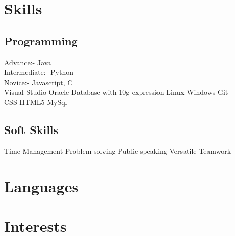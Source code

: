 \documentclass[]{mmynayak-resume-openfont}
\begin{document}
\begin{minipage}[t]{0.33\textwidth}

\section{Skills}
\subsection{Programming}

\textbullet{} Advance:- Java \\  \textbullet{} Intermediate:- Python \\ \textbullet{} Novice:- Javascript, C  \\
\sectionsep
{}
\textbullet{} Visual Studio \textbullet{} Oracle Database with 10g expression \textbullet{} Linux \textbullet{} Windows \textbullet{} Git \\
\sectionsep
{}
\textbullet{} CSS \textbullet{} HTML5 \textbullet{} MySql \\
\sectionsep
\subsection{Soft Skills}
\textbullet{} Time-Management \textbullet{} Problem-solving \textbullet{}Public speaking  \textbullet{}Versatile \textbullet{}Teamwork \\


\section{Languages}
\sectionsep


\section{Interests}
\sectionsep

%
%

\end{minipage} 
\end{document}
